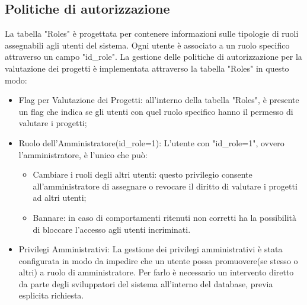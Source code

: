 \documentclass{article}
\begin{document}
\subsection{Politiche di autorizzazione}
La tabella "Roles" è progettata per contenere informazioni sulle tipologie di ruoli assegnabili agli utenti del sistema. Ogni utente è associato a un ruolo specifico attraverso un campo "id\_role". La gestione delle politiche di autorizzazione per la valutazione dei progetti è implementata attraverso la tabella "Roles" in questo modo:
\begin{itemize}
    \item Flag per Valutazione dei Progetti: all'interno della tabella "Roles", è presente un flag che indica se gli utenti con quel ruolo specifico hanno il permesso di valutare i progetti;
    \item Ruolo dell'Amministratore(id\_role=1): L'utente con "id\_role=1", ovvero l'amministratore, è l'unico che può:
    \begin{itemize}
        \item Cambiare i ruoli degli altri utenti: questo privilegio consente all'amministratore di assegnare o revocare il diritto di valutare i progetti ad altri utenti;
        \item Bannare: in caso di comportamenti ritenuti non corretti ha la possibilità di bloccare l'accesso agli utenti incriminati.
    \end{itemize}
    \item Privilegi Amministrativi: La gestione dei privilegi amministrativi è stata configurata in modo da impedire che un utente possa promuovere(se stesso o altri) a ruolo di amministratore. Per farlo è necessario un intervento diretto da parte degli sviluppatori del sistema all'interno del database, previa esplicita richiesta.
\end{itemize}
\end{document}
